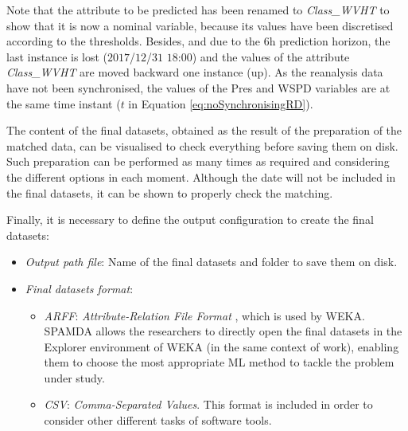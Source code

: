 \documentclass[energies,article,submit,moreauthors,pdftex]{Definitions/mdpi}
\begin{document}
\begin{itemize}[leftmargin=*,labelsep=5.8mm]
						Note that the attribute to be predicted has been renamed to \textit{Class\_WVHT} to show that it is now a nominal variable, because its values have been discretised according to the thresholds. Besides, and due to the $6$h prediction horizon, the last instance is lost ($2017$/$12$/$31$ $18$:$00$) and the values of the attribute \textit{Class\_WVHT} are moved backward one instance (up). As the reanalysis data have not been synchronised, the values of the Pres and WSPD variables are at the same time instant ($t$ in Equation \ref{eq:noSynchronisingRD}).
						
					\end{itemize}
				
				The content of the final datasets, obtained as the result of the preparation of the matched data, can be visualised to check everything before saving them on disk. Such preparation can be performed as many times as required and considering the different options in each moment. Although the date will not be included in the final datasets, it can be shown to properly check the matching.
				
				Finally, it is necessary to define the output configuration to create the final datasets:			
				\begin{itemize}[leftmargin=*,labelsep=5.8mm]

					\item \textit{Output path file}: Name of the final datasets and folder to save them on disk.
						
					\item \textit{Final datasets format}:

						\begin{itemize}[leftmargin=*,labelsep=5.8mm]
						
							\item \textit{ARFF}: \textit{Attribute-Relation File Format} \cite{WEKA_ARFF}, which is used by WEKA. SPAMDA allows the researchers to directly open the final datasets in the Explorer environment of WEKA (in the same context of work), enabling them to choose the most appropriate ML method to tackle the problem under study.

							\item \textit{CSV}: \textit{Comma-Separated Values}. This format is included in order to consider other different tasks of software tools.
							
						\end{itemize}
					
				\end{itemize}
				
\end{document}
